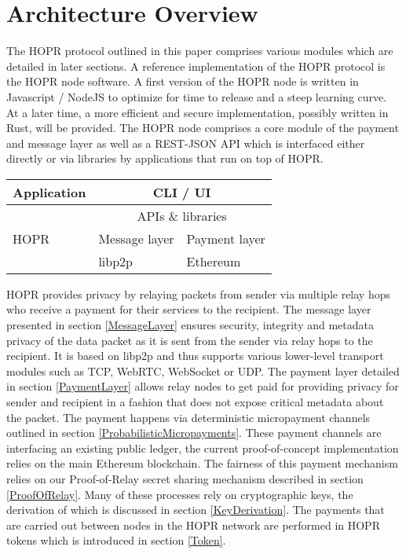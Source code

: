 \section{Architecture Overview}
The HOPR protocol outlined in this paper comprises various modules which are detailed in later sections. A reference implementation of the HOPR protocol is the HOPR node software. A first version of the HOPR node is written in Javascript / NodeJS to optimize for time to release and a steep learning curve. At a later time, a more efficient and secure implementation, possibly written in Rust, will be provided. The HOPR node comprises a core module of the payment and message layer as well as a REST-JSON API which is interfaced either directly or via libraries by applications that run on top of HOPR.

\setlength{\tabcolsep}{1em} %
{\renewcommand{\arraystretch}{2}%
\begin{center}
    \begin{tabular}{|l|l|l|}
        \hline
        Application & \multicolumn{2}{|c|}{CLI / UI}\\
        \hline
        \multirow{3}{*}{HOPR} & \multicolumn{2}{|c|}{APIs \& libraries}\\
        \cline{2-3}
         & Message layer & Payment layer\\
        \hline
        Infrastructure & libp2p & Ethereum\\
        \hline
    \end{tabular}
\end{center}
}

HOPR provides privacy by relaying packets from sender via multiple relay hops who receive a payment for their services to the recipient. The message layer presented in section \ref{MessageLayer} ensures security, integrity and metadata privacy of the data packet as it is sent from the sender via relay hops to the recipient. It is based on libp2p and thus supports various lower-level transport modules such as TCP, WebRTC, WebSocket or UDP. The payment layer detailed in section \ref{PaymentLayer} allows relay nodes to get paid for providing privacy for sender and recipient in a fashion that does not expose critical metadata about the packet. The payment happens via deterministic micropayment channels outlined in section \ref{ProbabilisticMicropayments}. These payment channels are interfacing an existing public ledger, the current proof-of-concept implementation relies on the main Ethereum blockchain. The fairness of this payment mechanism relies on our Proof-of-Relay secret sharing mechanism described in section \ref{ProofOfRelay}. Many of these processes rely on cryptographic keys, the derivation of which is discussed in section \ref{KeyDerivation}. The payments that are carried out between nodes in the HOPR network are performed in HOPR tokens which is introduced in section \ref{Token}.
